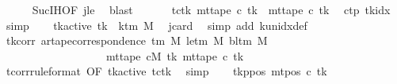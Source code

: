 \begin{isabellebody}
\ \ \ \ \isamarkupfalse%
\ Suc{\isachardot}{\kern0pt}IH{\isacharbrackleft}{\kern0pt}OF\ jle{\isacharbrackright}{\kern0pt}\ \isamarkupfalse%
\ blast\isanewline
\ \ %
\isanewline
\ \ \isamarkupfalse%
\ tc{\isacharunderscore}{\kern0pt}tk{\isacharcolon}{\kern0pt}\ {\isachardoublequoteopen}mt{\isacharunderscore}{\kern0pt}tape\ c\ {\isacharquery}{\kern0pt}tk\ {\isacharequal}{\kern0pt}\ mt{\isacharunderscore}{\kern0pt}tape\ c{}\ {\isacharquery}{\kern0pt}tk{\isachardoublequoteclose}\ \isamarkupfalse%
\ c{\isacharunderscore}{\kern0pt}tp\ tkidx\ \isamarkupfalse%
\ simp\isanewline
\ \ \isamarkupfalse%
\ tk{\isacharunderscore}{\kern0pt}active{\isacharcolon}{\kern0pt}\ {\isachardoublequoteopen}{\isacharquery}{\kern0pt}tk\ {\isacharless}{\kern0pt}\ k{\isacharunderscore}{\kern0pt}tm\ M{\isachardoublequoteclose}\ \isamarkupfalse%
\ jcard\ \isamarkupfalse%
\ {\isacharparenleft}{\kern0pt}simp\ add{\isacharcolon}{\kern0pt}\ k{\isacharunderscore}{\kern0pt}unidx{\isacharunderscore}{\kern0pt}def{\isacharparenright}{\kern0pt}\isanewline
\ \ \isamarkupfalse%
\ tk{\isacharunderscore}{\kern0pt}corr{\isacharcolon}{\kern0pt}\ {\isachardoublequoteopen}ar{\isacharunderscore}{\kern0pt}tape{\isacharunderscore}{\kern0pt}correspondence\ {\isacharparenleft}{\kern0pt}{\isasymGamma}{\isacharunderscore}{\kern0pt}tm\ M{\isacharparenright}{\kern0pt}\ {\isacharparenleft}{\kern0pt}le{\isacharunderscore}{\kern0pt}tm\ M{\isacharparenright}{\kern0pt}\ {\isacharparenleft}{\kern0pt}bl{\isacharunderscore}{\kern0pt}tm\ M{\isacharparenright}{\kern0pt}\isanewline
\ \ \ \ \ \ \ \ \ \ \ \ \ \ \ \ \ \ \ {\isacharparenleft}{\kern0pt}mt{\isacharunderscore}{\kern0pt}tape\ cM\ {\isacharquery}{\kern0pt}tk{\isacharparenright}{\kern0pt}\ {\isacharparenleft}{\kern0pt}mt{\isacharunderscore}{\kern0pt}tape\ c\ {\isacharquery}{\kern0pt}tk{\isacharparenright}{\kern0pt}{\isachardoublequoteclose}\isanewline
\ \ \ \ \isamarkupfalse%
\ tcorr{\isacharbrackleft}{\kern0pt}rule{\isacharunderscore}{\kern0pt}format{\isacharcomma}{\kern0pt}\ OF\ tk{\isacharunderscore}{\kern0pt}active{\isacharbrackright}{\kern0pt}\ tc{\isacharunderscore}{\kern0pt}tk\ \isamarkupfalse%
\ simp\isanewline
\ \ \isamarkupfalse%
\ tk{\isacharunderscore}{\kern0pt}ppos{\isacharcolon}{\kern0pt}\ {\isachardoublequoteopen}mt{\isacharunderscore}{\kern0pt}pos\ c\ {\isacharquery}{\kern0pt}tk\isanewline

\end{isabellebody}
